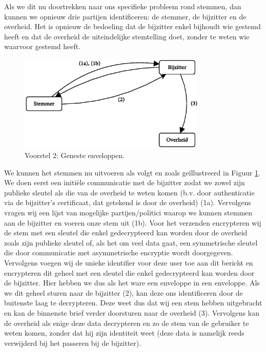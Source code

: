 \documentclass[a4paper,12pt]{article}
\begin{document}
Als we dit nu doortrekken naar ons specifieke probleem rond stemmen, dan kunnen
we opnieuw drie partijen identificeren: de stemmer, de bijzitter en de overheid.
Het is opnieuw de bedoeling dat de bijzitter enkel bijhoudt wie gestemd heeft en
dat de overheid de uiteindelijke stemtelling doet, zonder te weten wie waarvoor
gestemd heeft.

\begin{figure}
  \centering
  \includegraphics[width=0.8\textwidth]{includes/img/schema_voorstel2.eps}
  \caption{Voorstel 2: Geneste enveloppen.}
  \label{fig:voorstel2}
\end{figure}

We kunnen het stemmen nu uitvoeren als volgt en zoals ge\"illustreerd in Figuur
\ref{fig:voorstel2}. We doen eerst een initi\"ele communicatie met de bijzitter
zodat we zowel zijn publieke sleutel als die van de overheid te weten komen
(b.v. door authenticatie via de bijzitter's certificaat, dat getekend is door de
overheid) (1a). Vervolgens vragen wij een lijst van mogelijke partijen/politici
waarop we kunnen stemmen aan de bijzitter en voeren onze stem uit (1b). Voor
het verzenden encrypteren wij de stem met een sleutel die enkel gedecrypteerd
kan worden door de overheid zoals zijn publieke sleutel of, als het om veel
data gaat, een symmetrische sleutel die door communicatie met asymmetrische
encryptie wordt doorgegeven. Vervolgens voegen wij de unieke identifier voor
deze user toe aan dit bericht en encrypteren dit geheel met een sleutel die
enkel gedecrypteerd kan worden door de bijzitter. Hier hebben we dus als het
ware een enveloppe in een enveloppe. Als we dit geheel sturen naar de bijzitter
(2), kan deze ons identificeren door de buitenste laag te decrypteren. Deze
weet dus dat wij een stem hebben uitgebracht en kan de binnenste brief verder
doorsturen naar de overheid (3). Vervolgens kan de overheid als enige deze data
decrypteren en zo de stem van de gebruiker te weten komen, zonder dat hij zijn
identiteit weet (deze data is namelijk reeds verwijderd bij het passeren bij de
bijzitter).
\end{document}
